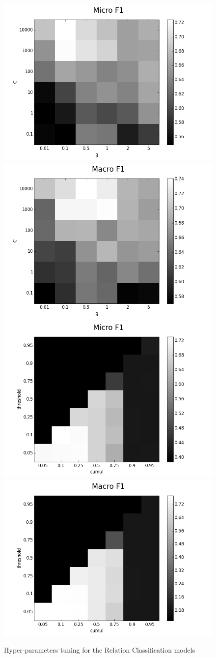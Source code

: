 \documentclass[12pt]{article}
\begin{document}
\begin{figure}[!ht]
    \centering
    \includegraphics[width=0.5\linewidth]{Figures/Tuning_Figures/relationClassification_kernel_tuning_Micro_F1.png}\hfill
    \includegraphics[width=0.5\linewidth]{Figures/Tuning_Figures/relationClassification_kernel_tuning_Macro_F1.png}\vfill
    \includegraphics[width=0.5\linewidth]{Figures/Tuning_Figures/relationClassification_threshold_tuning_Micro_F1.png}\hfill
    \includegraphics[width=0.5\linewidth]{Figures/Tuning_Figures/relationClassification_threshold_tuning_Macro_F1.png}
    \caption{\label{relationKernelTuning} Hyper-parameters tuning for the Relation Classification models}
\end{figure}
\end{document}
